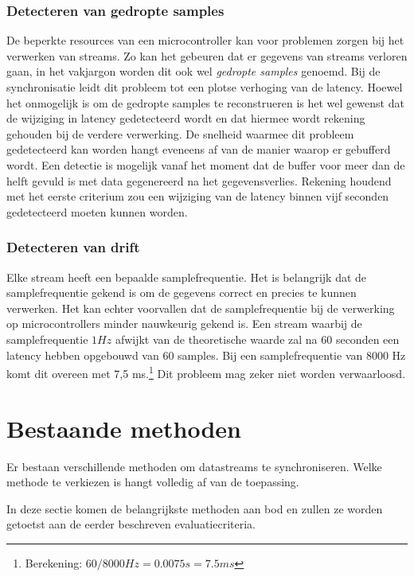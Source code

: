 \subsubsection{Detecteren van gedropte samples}

De beperkte resources van een microcontroller kan voor problemen zorgen bij het verwerken van streams. Zo kan het gebeuren dat er gegevens van streams verloren gaan, in het vakjargon worden dit ook wel \textit{gedropte samples} genoemd. Bij de synchronisatie leidt dit probleem tot een plotse verhoging van de latency. Hoewel het onmogelijk is om de gedropte samples te reconstrueren is het wel gewenst dat de wijziging in latency gedetecteerd wordt en dat hiermee wordt rekening gehouden bij de verdere verwerking. De snelheid waarmee dit probleem gedetecteerd kan worden hangt eveneens af van de manier waarop er gebufferd wordt. Een detectie is mogelijk vanaf het moment dat de buffer voor meer dan de helft gevuld is met data gegenereerd na het gegevensverlies. Rekening houdend met het eerste criterium zou een wijziging van de latency binnen vijf seconden gedetecteerd moeten kunnen worden.

\subsubsection{Detecteren van drift}

Elke stream heeft een bepaalde samplefrequentie. Het is belangrijk dat de samplefrequentie gekend is om de gegevens correct en precies te kunnen verwerken. Het kan echter voorvallen dat de samplefrequentie bij de verwerking op microcontrollers minder nauwkeurig gekend is. Een stream waarbij de samplefrequentie $ 1Hz $ afwijkt van de theoretische waarde zal na 60 seconden een latency hebben opgebouwd van 60 samples. Bij een samplefrequentie van 8000 Hz komt dit overeen met 7,5 ms.\footnote{Berekening: $ 60 / 8000 Hz = 0.0075 s = 7.5 ms $} Dit probleem mag zeker niet worden verwaarloosd. 

\section{Bestaande methoden}
\label{bestaande-methoden}

Er bestaan verschillende methoden om datastreams te synchroniseren. Welke methode te verkiezen is hangt volledig af van de toepassing.

In deze sectie komen de belangrijkste methoden aan bod en zullen ze worden getoetst aan de eerder beschreven evaluatiecriteria. 

